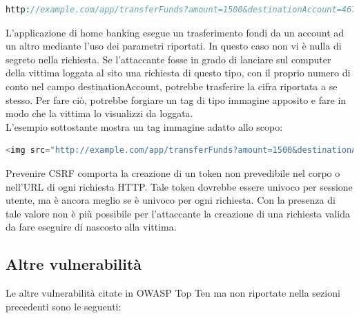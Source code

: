 \begin{lstlisting}[language=PHP]
http://example.com/app/transferFunds?amount=1500&destinationAccount=4673243243
\end{lstlisting}

L'applicazione di home banking esegue un trasferimento fondi da un account ad un altro mediante l'uso dei parametri riportati. In questo caso non vi è nulla di segreto nella richiesta. Se l'attaccante fosse in grado di lanciare sul computer della vittima loggata al sito una richiesta di questo tipo, con il proprio numero di conto nel campo destinationAccount, potrebbe trasferire la cifra riportata a se stesso. Per fare ciò, potrebbe forgiare un tag di tipo immagine apposito e fare in modo che la vittima lo visualizzi da loggata.\\
L'esempio sottostante mostra un tag immagine adatto allo scopo:\\

\begin{lstlisting}[language=PHP]
<img src="http://example.com/app/transferFunds?amount=1500&destinationAccount=attackersAcct#" width="0" height="0" />
\end{lstlisting}

Prevenire CSRF comporta la creazione di un token non prevedibile nel corpo o nell'URL di ogni richiesta HTTP. Tale token dovrebbe essere univoco per sessione utente, ma è ancora meglio se è univoco per ogni richiesta. Con la presenza di tale valore non è più possibile per l'attaccante la creazione di una richiesta valida da fare eseguire di nascosto alla vittima.

\subsection{Altre vulnerabilità}
Le altre vulnerabilità citate in OWASP Top Ten ma non riportate nella sezioni precedenti sono le seguenti:

